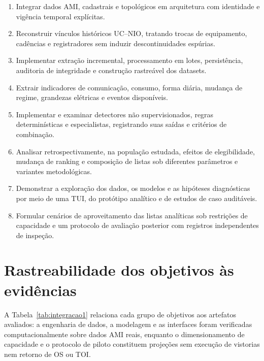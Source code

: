 \begin{enumerate}
\def\labelenumi{\arabic{enumi}.}
\tightlist
\item
  Integrar dados AMI, cadastrais e topológicos em arquitetura com identidade e vigência temporal explícitas.
\item
  Reconstruir vínculos históricos UC--NIO, tratando trocas de equipamento, cadências e registradores sem induzir descontinuidades espúrias.
\item
  Implementar extração incremental, processamento em lotes, persistência, auditoria de integridade e construção rastreável dos datasets.
\item
  Extrair indicadores de comunicação, consumo, forma diária, mudança de regime, grandezas elétricas e eventos disponíveis.
\item
  Implementar e examinar detectores não supervisionados, regras determinísticas e especialistas, registrando suas saídas e critérios de combinação.
\item
  Analisar retrospectivamente, na população estudada, efeitos de elegibilidade, mudança de ranking e composição de listas sob diferentes parâmetros e variantes metodológicas.
\item
  Demonstrar a exploração dos dados, os modelos e as hipóteses diagnósticas por meio de uma TUI, do protótipo analítico e de estudos de caso auditáveis.
\item
  Formular cenários de aproveitamento das listas analíticas sob restrições de capacidade e um protocolo de avaliação posterior com registros independentes de inspeção.
\end{enumerate}

\section{Rastreabilidade dos objetivos às evidências}\label{rastreabilidade-dos-objetivos-uxe0s-eviduxeancias}

A Tabela~\ref{tab:integracao1} relaciona cada grupo de objetivos aos artefatos avaliados: a engenharia de dados, a modelagem e as interfaces foram verificadas computacionalmente sobre dados AMI reais, enquanto o dimensionamento de capacidade e o protocolo de piloto constituem projeções sem execução de vistorias nem retorno de OS ou TOI.

